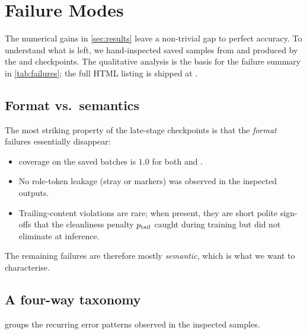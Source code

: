 \section{Failure Modes}
\label{sec:failure}

The numerical gains in \cref{sec:results} leave a non-trivial gap to
perfect accuracy. To understand what is left, we hand-inspected saved
samples from  and  produced by the
 and  checkpoints. The qualitative analysis is the
basis for the failure summary in \cref{tab:failures}; the full HTML
listing is shipped at .

\subsection{Format vs.\ semantics}
The most striking property of the late-stage checkpoints is that the
\emph{format} failures essentially disappear:
\begin{itemize}
  \item {} coverage on the saved  batches
    is $1.0$ for both  and .
  \item No role-token leakage (\eg stray  or
     markers) was observed in the inspected outputs.
  \item Trailing-content violations are rare; when present, they are
    short polite sign-offs that the cleanliness penalty $p_{\text{tail}}$ caught
    during training but did not eliminate at inference.
\end{itemize}

The remaining failures are therefore mostly \emph{semantic}, which is
what we want to characterise.

\subsection{A four-way taxonomy}
 groups the recurring error patterns observed in the
inspected samples.

